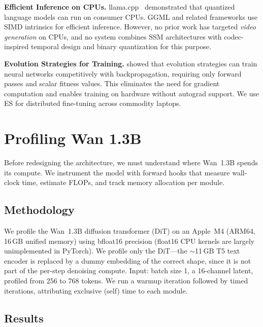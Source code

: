 \documentclass[11pt]{article}
\begin{document}
\textbf{Efficient Inference on CPUs.}
llama.cpp~\citep{llamacpp2023} demonstrated that quantized language models can run on consumer CPUs. GGML and related frameworks use SIMD intrinsics for efficient inference. However, no prior work has targeted \emph{video generation} on CPUs, and no system combines SSM architectures with codec-inspired temporal design and binary quantization for this purpose.

\textbf{Evolution Strategies for Training.}
\citet{salimans2017evolution} showed that evolution strategies can train neural networks competitively with backpropagation, requiring only forward passes and scalar fitness values. This eliminates the need for gradient computation and enables training on hardware without autograd support. We use ES for distributed fine-tuning across commodity laptops.


\section{Profiling Wan 1.3B}
\label{sec:profiling}

Before redesigning the architecture, we must understand where Wan~1.3B spends its compute. We instrument the model with forward hooks that measure wall-clock time, estimate FLOPs, and track memory allocation per module.

\subsection{Methodology}

We profile the Wan~1.3B diffusion transformer (DiT) on an Apple~M4 (ARM64, 16\,GB unified memory) using bfloat16 precision (float16 CPU kernels are largely unimplemented in PyTorch). We profile only the DiT---the $\sim$11\,GB T5 text encoder is replaced by a dummy embedding of the correct shape, since it is not part of the per-step denoising compute. Input: batch size 1, a 16-channel latent, profiled from 256 to 768 tokens. We run a warmup iteration followed by timed iterations, attributing exclusive (self) time to each module.

\subsection{Results}
\end{document}
